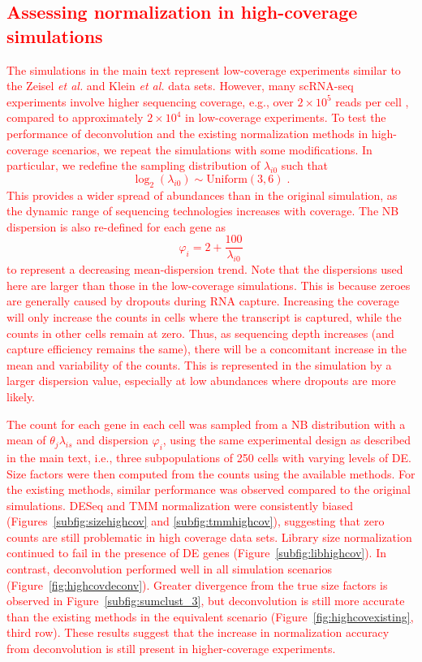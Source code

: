 \documentclass{article}
\newcommand\revised[1]{\textcolor{red}{#1}}
\begin{document}
\revised{\section{Assessing normalization in high-coverage simulations}
The simulations in the main text represent low-coverage experiments similar to the Zeisel \textit{et al.} and Klein \textit{et al.} data sets.
However, many scRNA-seq experiments involve higher sequencing coverage, e.g., over $2\times 10^5$ reads per cell \cite{saraiva2015hierarchical,kolod2015single}, compared to approximately $2\times10^4$ in low-coverage experiments.
To test the performance of deconvolution and the existing normalization methods in high-coverage scenarios, we repeat the simulations with some modifications.
In particular, we redefine the sampling distribution of $\lambda_{i0}$ such that 
\[
    \log_2(\lambda_{i0}) \sim \mbox{Uniform}(3, 6) \;.
\]
This provides a wider spread of abundances than in the original simulation, as the dynamic range of sequencing technologies increases with coverage.
The NB dispersion is also re-defined for each gene as 
\[
    \varphi_i = 2 + \frac{100}{\lambda_{i0}}
\]
to represent a decreasing mean-dispersion trend.
Note that the dispersions used here are larger than those in the low-coverage simulations.
This is because zeroes are generally caused by dropouts during RNA capture.
Increasing the coverage will only increase the counts in cells where the transcript is captured, while the counts in other cells remain at zero.
Thus, as sequencing depth increases (and capture efficiency remains the same), there will be a concomitant increase in the mean and variability of the counts.
This is represented in the simulation by a larger dispersion value, especially at low abundances where dropouts are more likely.}

\revised{The count for each gene in each cell was sampled from a NB distribution with a mean of $\theta_{j}\lambda_{is}$ and dispersion $\varphi_i$, using the same experimental design as described in the main text, i.e., three subpopulations of 250 cells with varying levels of DE.
Size factors were then computed from the counts using the available methods.
For the existing methods, similar performance was observed compared to the original simulations.
DESeq and TMM normalization were consistently biased (Figures~\ref{subfig:sizehighcov} and \ref{subfig:tmmhighcov}), suggesting that zero counts are still problematic in high coverage data sets.
Library size normalization continued to fail in the presence of DE genes (Figure~\ref{subfig:libhighcov}).
In contrast, deconvolution performed well in all simulation scenarios (Figure~\ref{fig:highcovdeconv}).
Greater divergence from the true size factors is observed in Figure~\ref{subfig:sumclust_3}, but deconvolution is still more accurate than the existing methods in the equivalent scenario (Figure~\ref{fig:highcovexisting}, third row).
These results suggest that the increase in normalization accuracy from deconvolution is still present in higher-coverage experiments.
}
\end{document}
